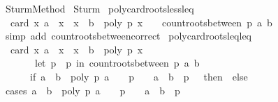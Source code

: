 %
\begin{isabellebody}%
\def\isabellecontext{Sturm{\isacharunderscore}Method}%
%
\isadelimtheory
%
\endisadelimtheory
%
\isatagtheory
{}\isamarkupfalse%
\ Sturm{\isacharunderscore}Method\isanewline
{}\ Sturm\isanewline
{}%
\endisatagtheory
{\isafoldtheory}%
%
\isadelimtheory
%
\endisadelimtheory
%
\isamarkuptrue%
\isamarkupfalse%
\ poly{\isacharunderscore}card{\isacharunderscore}roots{\isacharunderscore}less{\isacharunderscore}leq{\isacharcolon}\isanewline
\ \ {\isachardoublequoteopen}card\ {\isacharbraceleft}x{\isachardot}\ a\ {\isacharless}\ x\ {\isasymand}\ x\ {\isasymle}\ b\ {\isasymand}\ poly\ p\ x\ {\isacharequal}\ {}{\isacharbraceright}\ {\isacharequal}\ count{\isacharunderscore}roots{\isacharunderscore}between\ p\ a\ b{\isachardoublequoteclose}\isanewline
%
\isadelimproof
\ \ %
\endisadelimproof
%
\isatagproof
{}\isamarkupfalse%
\ {\isacharparenleft}simp\ add{\isacharcolon}\ count{\isacharunderscore}roots{\isacharunderscore}between{\isacharunderscore}correct{\isacharparenright}%
\endisatagproof
{\isafoldproof}%
%
\isadelimproof
\isanewline
%
\endisadelimproof
\isanewline
{}\isamarkupfalse%
\ poly{\isacharunderscore}card{\isacharunderscore}roots{\isacharunderscore}leq{\isacharunderscore}leq{\isacharcolon}\isanewline
\ \ {\isachardoublequoteopen}card\ {\isacharbraceleft}x{\isachardot}\ a\ {\isasymle}\ x\ {\isasymand}\ x\ {\isasymle}\ b\ {\isasymand}\ poly\ p\ x\ {\isacharequal}\ {}{\isacharbraceright}\ {\isacharequal}\ \isanewline
\ \ \ \ \ \ \ {\isacharparenleft}let\ p\ {\isacharequal}\ p\ in\ count{\isacharunderscore}roots{\isacharunderscore}between\ p\ a\ b\ {\isacharplus}\ \isanewline
\ \ \ \ \ \ {\isacharparenleft}if\ {\isacharparenleft}a\ {\isasymle}\ b\ {\isasymand}\ poly\ p\ a\ {\isacharequal}\ {}\ {\isasymand}\ p\ {\isasymnoteq}\ {}{\isacharparenright}\ {\isasymor}\ {\isacharparenleft}a\ {\isacharequal}\ b\ {\isasymand}\ p\ {\isacharequal}\ {}{\isacharparenright}\ then\ {}\ else\ {}{\isacharparenright}{\isacharparenright}{\isachardoublequoteclose}\isanewline
%
\isadelimproof
%
\endisadelimproof
%
\isatagproof
{}\isamarkupfalse%
\ {\isacharparenleft}cases\ {\isachardoublequoteopen}{\isacharparenleft}a\ {\isasymle}\ b\ {\isasymand}\ poly\ p\ a\ {\isacharequal}\ {}\ {\isasymand}\ p\ {\isasymnoteq}\ {}{\isacharparenright}\ {\isasymor}\ {\isacharparenleft}a\ {\isacharequal}\ b\ {\isasymand}\ p\ {\isacharequal}\ {}{\isacharparenright}{\isachardoublequoteclose}{\isacharparenright}\isanewline

\end{isabellebody}
